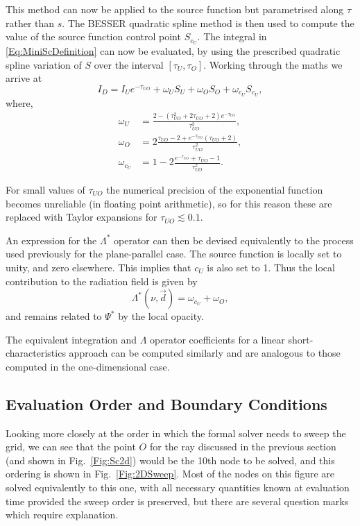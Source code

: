 This method can now be applied to the source function but parametrised along $\tau$ rather than $s$.
The BESSER quadratic spline method is then used to compute the value of the source function control point $S_{c_U}$.
The integral in \eqref{Eq:MiniScDefinition} can now be evaluated, by using the prescribed quadratic spline variation of $S$ over the interval $[\tau_{U}, \tau_{O}]$.
Working through the maths we arrive at
\begin{equation}
    I_D = I_Ue^{-\tau_{UO}} + \omega_U S_U + \omega_O S_O + \omega_{c_U} S_{c_U},
\end{equation}
where,
{
\def\edt{e^{-\tau_{UO}}}
\def\tsq{\tau_{UO}^2}
\begin{align}
    \omega_U &= \frac{2 - (\tsq + 2\tau_{UO} + 2)\edt}{\tsq},\\
    \omega_O &= 2\frac{\tau_{UO} - 2 + \edt (\tau_{UO} + 2)}{\tsq},\\
    \omega_{c_U} &= 1 - 2 \frac{\edt + \tau_{UO} - 1}{\tsq}.
\end{align}
}

For small values of $\tau_{UO}$ the numerical precision of the exponential function becomes unreliable (in floating point arithmetic), so for this reason these are replaced with Taylor expansions for $\tau_{UO}\lesssim 0.1$.

An expression for the $\Lambda^*$ operator can then be devised equivalently to the process used previously for the plane-parallel case.
The source function is locally set to unity, and zero elsewhere.
This implies that $c_U$ is also set to 1.
Thus the local contribution to the radiation field is given by
\begin{equation}
    \Lambda^*(\nu, \vec{d}) = \omega_{c_U} + \omega_O,
\end{equation}
and remains related to $\Psi^*$ by the local opacity.

The equivalent integration and $\Lambda$ operator coefficients for a linear short-characteristics approach can be computed similarly and are analogous to those computed in the one-dimensional case.

\subsection{Evaluation Order and Boundary Conditions}\label{Sec:2dEvalOrder}

Looking more closely at the order in which the formal solver needs to sweep the grid, we can see that the point $O$ for the ray discussed in the previous section (and shown in Fig.~\ref{Fig:Sc2d}) would be the 10th node to be solved, and this ordering is shown in Fig.~\ref{Fig:2DSweep}.
Most of the nodes on this figure are solved equivalently to this one, with all necessary quantities known at evaluation time provided the sweep order is preserved, but there are several question marks which require explanation.

